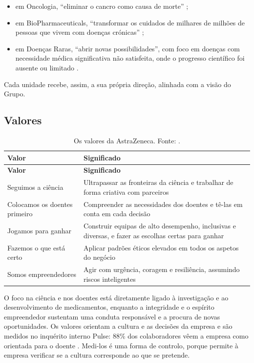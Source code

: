 \begin{itemize}
  \item em Oncologia, ``eliminar o cancro como causa de morte'' \cite[p.~14]{AR};
  \item em BioPharmaceuticals, ``transformar os cuidados de milhares de milhões de pessoas que vivem com doenças crónicas'' \cite[p.~16]{AR};
  \item em Doenças Raras, ``abrir novas possibilidades'', com foco em doenças com necessidade médica significativa não satisfeita, onde o progresso científico foi ausente ou limitado \cite[p.~22]{AR}.
\end{itemize}

Cada unidade recebe, assim, a sua própria direção, alinhada com a visão do Grupo.

\subsection{Valores}

\begin{xltabular}{\linewidth}{@{}lY@{}}
\caption{Os valores da AstraZeneca. Fonte: \cite[p.~8]{AR}.}\label{tab:valores}\\*
\toprule
\textbf{Valor} & \textbf{Significado} \\*
\midrule
\endfirsthead
\toprule
\textbf{Valor} & \textbf{Significado} \\*
\midrule
\endhead
\bottomrule
\endfoot
Seguimos a ciência & Ultrapassar as fronteiras da ciência e trabalhar de forma criativa com parceiros \\
Colocamos os doentes primeiro & Compreender as necessidades dos doentes e tê-las em conta em cada decisão \\
Jogamos para ganhar & Construir equipas de alto desempenho, inclusivas e diversas, e fazer as escolhas certas para ganhar \\
Fazemos o que está certo & Aplicar padrões éticos elevados em todos os aspetos do negócio \\
Somos empreendedores & Agir com urgência, coragem e resiliência, assumindo riscos inteligentes \\
\end{xltabular}

O foco na ciência e nos doentes está diretamente ligado à investigação e ao desenvolvimento de medicamentos, enquanto a integridade e o espírito empreendedor sustentam uma conduta responsável e a procura de novas oportunidades. Os valores orientam a cultura e as decisões da empresa e são medidos no inquérito interno Pulse: 88\% dos colaboradores vêem a empresa como orientada para o doente \cite[p.~38]{AR}. Medi-los é uma forma de controlo, porque permite à empresa verificar se a cultura corresponde ao que se pretende.

